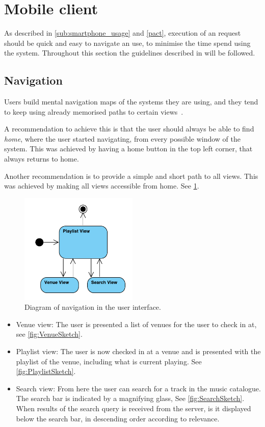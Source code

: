 \section{Mobile client}

As described in \cref{sub:smartphone_usage} and \cref{pact}, execution
of an request should be quick and easy to navigate an use, to minimise
the time spend using the system. Throughout this section the
guidelines described in  will be followed.

\subsection{Navigation}

Users build mental navigation maps of the systems they are using, and
they tend to keep using already memorised paths to certain views~\cite{DEB}.

A recommendation to achieve this is that the user should always be able to find \emph{home}, where the user started navigating, from every possible window of the system. This was achieved by having a home button in the top left corner, that always returns to home.

Another recommendation is to provide a simple and short path to all views. This
was achieved by making all views accessible from home. See \cref{fig:UserInterface}.

\begin{figure}[hbtp]
  \centering
  \includegraphics[width=0.5\textwidth]{Images/UserInterface.pdf}
  \caption{Diagram of navigation in the user interface.}\label{fig:UserInterface}
\end{figure}

\begin{itemize}
\item Venue view: The user is presented a list of venues for the user to check in at, see \cref{fig:VenueSketch}.
\item Playlist view: The user is now checked in at a venue and is presented with the playlist of the venue, including what is current playing. See \cref{fig:PlaylistSketch}.
\item Search view: From here the user can search for a track in the music catalogue. The search bar is indicated by a magnifying glass, See \cref{fig:SearchSketch}. When results of the search query is received from the server, is it displayed below the search bar, in descending order according to relevance.
\end{itemize}


